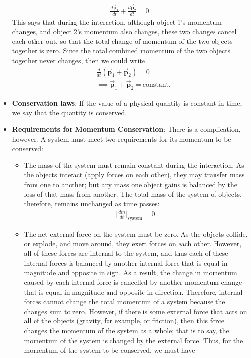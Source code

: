 \documentclass{report}
\begin{document}
\begin{itemize}
\begin{align*}
                \frac{d\vec{\mathbf{p}}_{1}}{dt} + \frac{d\vec{\mathbf{p}}_{2}}{dt} = 0
            .\end{align*}
            \bigbreak \noindent 
            This says that during the interaction, although object 1’s momentum changes, and object 2’s momentum also changes, these two changes cancel each other out, so that the total change of momentum of the two objects together is zero.
            \bigbreak \noindent 
            Since the total combined momentum of the two objects together never changes, then we could write
            \begin{align*}
                &\frac{d}{dt} (\vec{\mathbf{p}}_{1} + \vec{\mathbf{p}}_{2}) = 0 \\
                &\implies \vec{\mathbf{p}}_{1} + \vec{\mathbf{p}}_{2} = \text{constant}
            .\end{align*}
        \item \textbf{Conservation laws}:
            If the value of a physical quantity is constant in time, we say that the quantity is conserved.
        \item \textbf{Requirements for Momentum Conservation}:
            There is a complication, however. A system must meet two requirements for its momentum to be conserved:
            \begin{itemize}
                \item The mass of the system must remain constant during the interaction.
                    As the objects interact (apply forces on each other), they may transfer mass from one to another; but any mass one object gains is balanced by the loss of that mass from another. The total mass of the system of objects, therefore, remains unchanged as time passes:
                    \begin{align*}
                        \bigg[\frac{dm}{dt}\bigg]_{\text{system}} = 0
                    .\end{align*}
                \item The net external force on the system must be zero.
                    As the objects collide, or explode, and move around, they exert forces on each other. However, all of these forces are internal to the system, and thus each of these internal forces is balanced by another internal force that is equal in magnitude and opposite in sign. As a result, the change in momentum caused by each internal force is cancelled by another momentum change that is equal in magnitude and opposite in direction. Therefore, internal forces cannot change the total momentum of a system because the changes sum to zero. However, if there is some external force that acts on all of the objects (gravity, for example, or friction), then this force changes the momentum of the system as a whole; that is to say, the momentum of the system is changed by the external force. Thus, for the momentum of the system to be conserved, we must have

\end{itemize}
\end{itemize}
\end{document}
